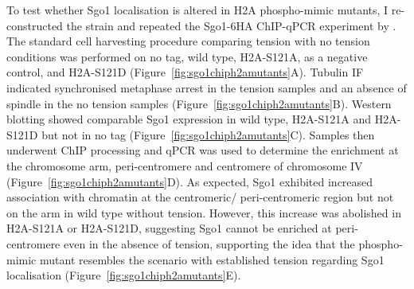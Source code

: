 To test whether Sgo1 localisation is altered in H2A phospho-mimic mutants, I re-constructed the strain and repeated the Sgo1-6HA ChIP-qPCR experiment by \cite{Nerusheva2014}. The standard cell harvesting procedure comparing tension with no tension conditions was performed on no tag, wild type, H2A-S121A, as a negative control, and H2A-S121D (Figure~\ref{fig:sgo1chiph2amutants}A). Tubulin IF indicated synchronised metaphase arrest in the tension samples and an absence of spindle in the no tension samples (Figure~\ref{fig:sgo1chiph2amutants}B). Western blotting showed comparable Sgo1 expression in wild type, H2A-S121A and H2A-S121D but not in no tag (Figure~\ref{fig:sgo1chiph2amutants}C). Samples then underwent ChIP processing and qPCR was used to determine the enrichment at the chromosome arm, peri-centromere and centromere of chromosome IV (Figure~\ref{fig:sgo1chiph2amutants}D). As expected, Sgo1 exhibited increased association with chromatin at the centromeric/ peri-centromeric region but not on the arm in wild type without tension. However, this increase was abolished in H2A-S121A or H2A-S121D, suggesting Sgo1 cannot be enriched at peri-centromere even in the absence of tension, supporting the idea that the phospho-mimic mutant resembles the scenario with established tension regarding Sgo1 localisation (Figure~\ref{fig:sgo1chiph2amutants}E). 

